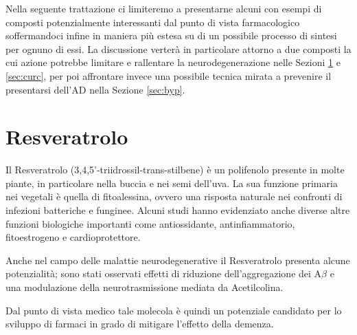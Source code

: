\documentclass[a4paper, 12pt]{article}
\begin{document}
Nella seguente trattazione ci limiteremo a presentarne alcuni con esempi di composti potenzialmente interessanti dal punto di vista farmacologico soffermandoci infine in maniera più estesa su di un possibile processo di sintesi per ognuno di essi.
La discussione verterà in particolare attorno a due composti la cui azione potrebbe limitare e rallentare la neurodegenerazione nelle Sezioni \ref{sec:resv} e \ref{sec:curc}, per poi affrontare invece una possibile tecnica mirata a prevenire il presentarsi dell'AD nella Sezione \ref{sec:byp}.

\section{Resveratrolo}
\label{sec:resv}
Il Resveratrolo (3,4,5'-triidrossil-trans-stilbene) è un polifenolo presente in molte piante, in particolare nella buccia e nei semi dell'uva. La sua funzione primaria nei vegetali è quella di fitoalessina, ovvero una risposta naturale nei confronti di infezioni batteriche e funginee. Alcuni studi hanno evidenziato anche diverse altre funzioni biologiche importanti come antiossidante, antinfiammatorio, fitoestrogeno e cardioprotettore.

Anche nel campo delle malattie neurodegenerative il Resveratrolo presenta alcune potenzialità; sono stati osservati effetti di riduzione dell'aggregazione dei A$\beta$ e una modulazione della neurotrasmissione mediata da Acetilcolina.

Dal punto di vista medico tale molecola è quindi un potenziale candidato per lo sviluppo di farmaci in grado di mitigare l'effetto della demenza. \cite{jabir_cholinesterase_2018}
\end{document}
